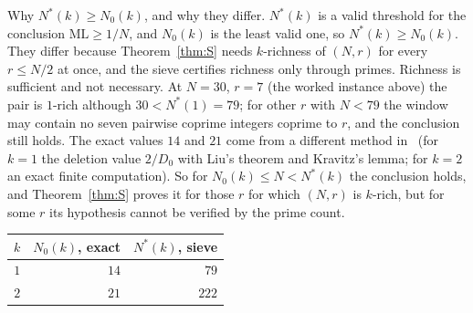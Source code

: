 \documentclass[11pt]{article}
\theoremstyle{definition}
\theoremstyle{remark}
\newcommand{\ML}{\mathrm{ML}}
\begin{document}
Why $N^*(k)\ge N_0(k)$, and why they differ. $N^*(k)$ is a valid threshold for the conclusion $\ML\ge1/N$, and $N_0(k)$ is the least valid one, so $N^*(k)\ge N_0(k)$. They differ because Theorem~\ref{thm:S} needs $k$-richness of $(N,r)$ for every $r\le N/2$ at once, and the sieve certifies richness only through primes. Richness is sufficient and not necessary. At $N=30$, $r=7$ (the worked instance above) the pair is $1$-rich although $30<N^*(1)=79$; for other $r$ with $N<79$ the window may contain no seven pairwise coprime integers coprime to $r$, and the conclusion still holds. The exact values $14$ and $21$ come from a different method in~\cite{A1} (for $k=1$ the deletion value $2/D_0$ with Liu's theorem and Kravitz's lemma; for $k=2$ an exact finite computation). So for $N_0(k)\le N<N^*(k)$ the conclusion holds, and Theorem~\ref{thm:S} proves it for those $r$ for which $(N,r)$ is $k$-rich, but for some $r$ its hypothesis cannot be verified by the prime count.
\begin{center}
\small
\begin{tabular}{r r r}
\toprule
$k$ & $N_0(k)$, exact & $N^*(k)$, sieve \\
\midrule
$1$ & $14$ & $79$ \\
$2$ & $21$ & $222$ \\
\bottomrule
\end{tabular}
\end{center}
\end{document}
